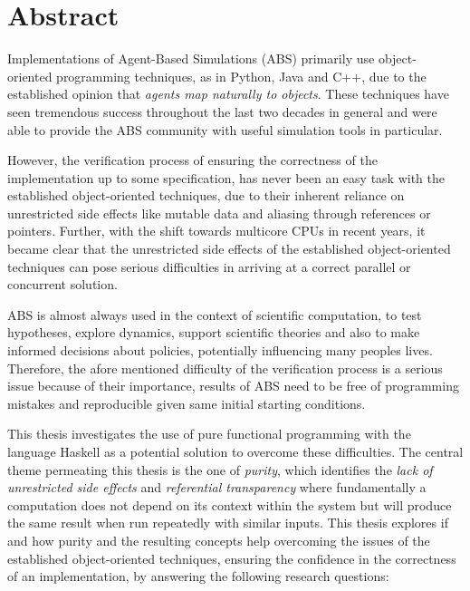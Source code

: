 \section*{Abstract}
Implementations of Agent-Based Simulations (ABS) primarily use object- \\ oriented programming techniques, as in Python, Java and C++, due to the established opinion that \textit{agents map naturally to objects}. These techniques have seen tremendous success throughout the last two decades in general and were able to provide the ABS community with useful simulation tools in particular.

However, the verification process of ensuring the correctness of the implementation up to some specification, has never been an easy task with the established object-oriented techniques, due to their inherent reliance on unrestricted side effects like mutable data and aliasing through references or pointers.
Further, with the shift towards multicore CPUs in recent years, it became clear that the unrestricted side effects of the established object-oriented techniques can pose serious difficulties in arriving at a correct parallel or concurrent solution.

ABS is almost always used in the context of scientific computation, to test hypotheses, explore dynamics, support scientific theories and also to make informed decisions about policies, potentially influencing many peoples lives. Therefore, the afore mentioned difficulty of the verification process is a serious issue because of their importance, results of ABS need to be free of programming mistakes and reproducible given same initial starting conditions.

\medskip

This thesis investigates the use of pure functional programming with the language Haskell as a potential solution to overcome these difficulties. The central theme permeating this thesis is the one of \textit{purity}, which identifies the \textit{lack of unrestricted side effects} and \textit{referential transparency} where fundamentally a computation does not depend on its context within the system but will produce the same result when run repeatedly with similar inputs. This thesis explores if and how purity and the resulting concepts help overcoming the issues of the established object-oriented techniques, ensuring the confidence in the correctness of an implementation, by answering the following research questions:

